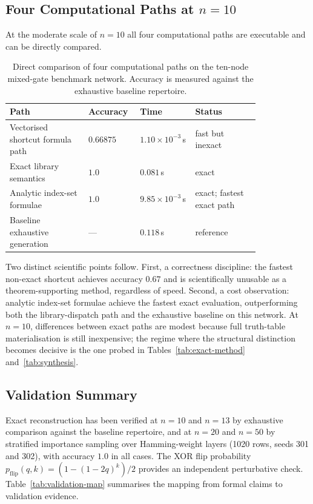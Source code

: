 \documentclass[11pt]{article}
\theoremstyle{definition}
\begin{document}
\subsection{Four Computational Paths at \texorpdfstring{\(n=10\)}{n=10}}\label{sec:four-paths}

At the moderate scale of \(n=10\) all four computational paths are executable and can be directly
compared.

\begin{table}[h]
\centering
\begin{tabular}{p{0.29\linewidth}p{0.12\linewidth}p{0.18\linewidth}p{0.23\linewidth}}
\toprule
\textbf{Path} & \textbf{Accuracy} & \textbf{Time} & \textbf{Status} \\
\midrule
Vectorised shortcut formula path & \(0.66875\) & \(1.10\times10^{-3}\)\,s & fast but inexact \\
Exact library semantics           & \(1.0\)     & \(0.081\)\,s             & exact \\
Analytic index-set formulae       & \(1.0\)     & \(9.85\times10^{-3}\)\,s & exact; fastest exact path \\
Baseline exhaustive generation    & ---         & \(0.118\)\,s             & reference \\
\bottomrule
\end{tabular}
\caption{Direct comparison of four computational paths on the ten-node mixed-gate benchmark network.
Accuracy is measured against the exhaustive baseline repertoire.}
\label{tab:four-paths}
\end{table}

Two distinct scientific points follow. First, a correctness discipline: the fastest non-exact
shortcut achieves accuracy \(0.67\) and is scientifically unusable as a theorem-supporting method,
regardless of speed. Second, a cost observation: analytic index-set formulae achieve the fastest
exact evaluation, outperforming both the library-dispatch path and the exhaustive baseline on this
network. At \(n=10\), differences between exact paths are modest because full truth-table
materialisation is still inexpensive; the regime where the structural distinction becomes decisive
is the one probed in Tables~\ref{tab:exact-method} and~\ref{tab:synthesis}.

\subsection{Validation Summary}

Exact reconstruction has been verified at $n=10$ and $n=13$ by exhaustive comparison against the baseline repertoire, and at $n=20$ and $n=50$ by stratified importance sampling over Hamming-weight layers (1020 rows, seeds 301 and 302), with accuracy $1.0$ in all cases. The XOR flip probability $p_{\mathrm{flip}}(q,k) = (1-(1-2q)^k)/2$ provides an independent perturbative check. Table~\ref{tab:validation-map} summarises the mapping from formal claims to validation evidence.
\end{document}
